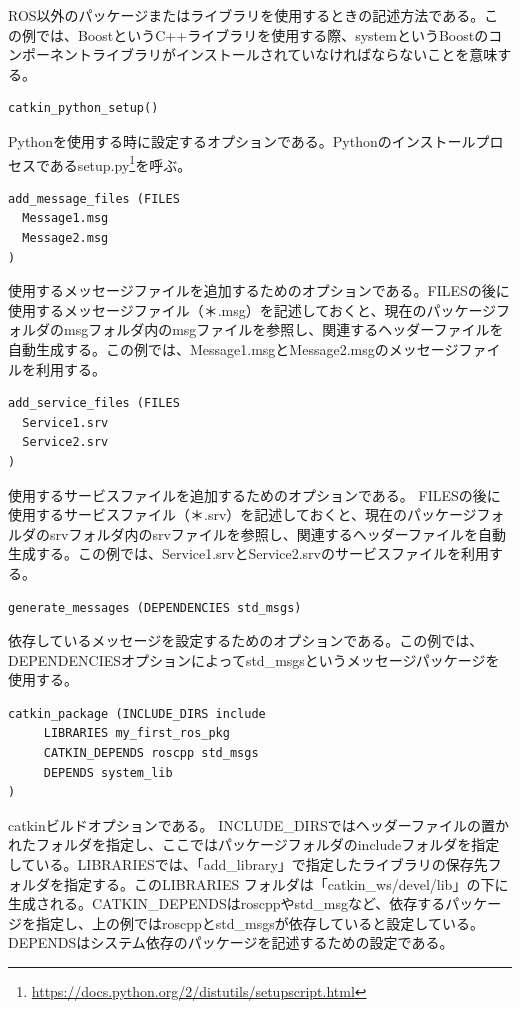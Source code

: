 ROS以外のパッケージまたはライブラリを使用するときの記述方法である。この例では、BoostというC++ライブラリを使用する際、systemというBoostのコンポーネントライブラリがインストールされていなければならないことを意味する。

\begin{lstlisting}[language=make]
catkin_python_setup()
\end{lstlisting}

Pythonを使用する時に設定するオプションである。Pythonのインストールプロセスであるsetup.py\footnote{\url{https://docs.python.org/2/distutils/setupscript.html}}を呼ぶ。

\begin{lstlisting}[language=make]
add_message_files (FILES
  Message1.msg
  Message2.msg
)
\end{lstlisting}

使用するメッセージファイルを追加するためのオプションである。FILESの後に使用するメッセージファイル（＊.msg）を記述しておくと、現在のパッケージフォルダのmsgフォルダ内のmsgファイルを参照し、関連するヘッダーファイルを自動生成する。この例では、Message1.msgとMessage2.msgのメッセージファイルを利用する。

\begin{lstlisting}[language=make]
add_service_files (FILES
  Service1.srv
  Service2.srv
)
\end{lstlisting}

使用するサービスファイルを追加するためのオプションである。 FILESの後に使用するサービスファイル（＊.srv）を記述しておくと、現在のパッケージフォルダのsrvフォルダ内のsrvファイルを参照し、関連するヘッダーファイルを自動生成する。この例では、Service1.srvとService2.srvのサービスファイルを利用する。

\begin{lstlisting}[language=make]
generate_messages (DEPENDENCIES std_msgs)
\end{lstlisting}

依存しているメッセージを設定するためのオプションである。この例では、DEPENDENCIESオプションによってstd\_msgsというメッセージパッケージを使用する。

\begin{lstlisting}[language=make]
catkin_package (INCLUDE_DIRS include
     LIBRARIES my_first_ros_pkg
     CATKIN_DEPENDS roscpp std_msgs
     DEPENDS system_lib
)
\end{lstlisting}

catkinビルドオプションである。 INCLUDE\_DIRSではヘッダーファイルの置かれたフォルダを指定し、ここではパッケージフォルダのincludeフォルダを指定している。LIBRARIESでは、「add\_library」で指定したライブラリの保存先フォルダを指定する。このLIBRARIES フォルダは「catkin\_ws/devel/lib」の下に生成される。CATKIN\_DEPENDSはroscppやstd\_msgなど、依存するパッケージを指定し、上の例ではroscppとstd\_msgsが依存していると設定している。DEPENDSはシステム依存のパッケージを記述するための設定である。

